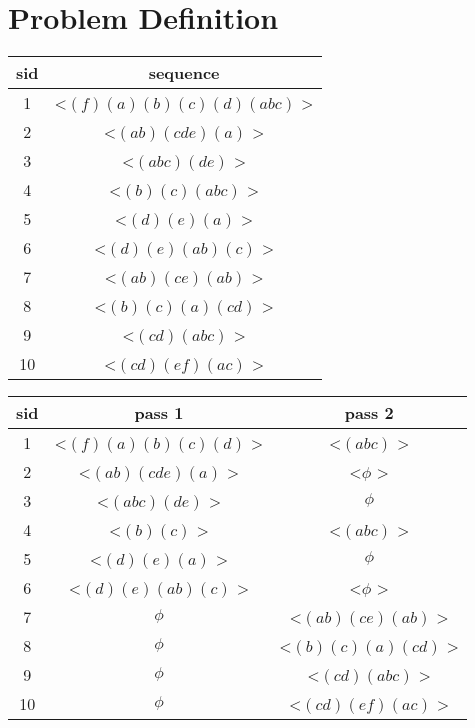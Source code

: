 \section{Problem Definition} \label{problem_definition}

\begin{table*}[!htb]
\parbox{.35\linewidth}{
\centering
\begin{tabular}{|c|c|}
\hline
sid & sequence\\
\hline
1 & \textless $(f)(a)(b)(c)(d)(abc)$ \textgreater\\
\hline
2 & \textless $(ab)(cde)(a)$ \textgreater \\ 
\hline 
3 & \textless $(abc)(de)$ \textgreater \\
\hline 
4 & \textless $(b)(c)(abc)$ \textgreater \\
\hline 
5 & \textless $(d)(e)(a)$ \textgreater \\
\hline 
6 & \textless $(d)(e)(ab)(c)$ \textgreater \\
\hline 
7 & \textless $(ab)(ce)(ab)$ \textgreater\\
\hline 
8 & \textless $(b)(c)(a)(cd)$ \textgreater\\
\hline 
9 & \textless $(cd)(abc)$ \textgreater \\
\hline 
10 & \textless $(cd)(ef)(ac)$ \textgreater \\
\hline 
\end{tabular}
\caption{Static Database} \label{table:static_database}
}
\hfill
\parbox{.65\linewidth}{
\centering
\begin{tabular}{|c|c|c|}
\hline
sid & pass 1 & pass 2\\
\hline
1 & \textless $(f)(a)(b)(c)(d)$ \textgreater & \textless $(abc)$ \textgreater\\
\hline
2 & \textless $(ab)(cde)(a)$ \textgreater & \textless $\phi$ \textgreater \\ 
\hline 
3 & \textless $(abc)(de)$ \textgreater & $\phi$ \\
\hline 
4 & \textless $(b)(c)$ \textgreater & \textless $(abc)$ \textgreater \\
\hline 
5 & \textless $(d)(e)(a)$ \textgreater & $\phi$\\
\hline 
6 & \textless $(d)(e)(ab)(c)$ \textgreater & \textless $\phi$ \textgreater\\
\hline 
7 & $\phi$ & \textless $(ab)(ce)(ab)$ \textgreater\\
\hline 
8 & $\phi$ & \textless $(b)(c)(a)(cd)$ \textgreater\\
\hline 
9 & $\phi$ & \textless $(cd)(abc)$ \textgreater \\
\hline 
10 & $\phi$ & \textless $(cd)(ef)(ac)$ \textgreater \\
\hline 
\end{tabular}
\caption{Incremental Database} \label{table:incremental_database}
}
\end{table*}

